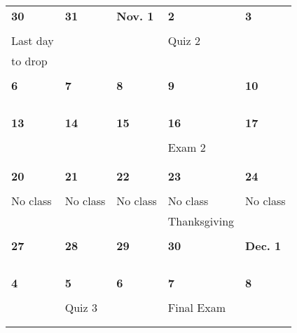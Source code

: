 \documentclass[letter, 12pt]{article}
\begin{document}
\begin{center}
\begin{tabular}{|l|l|l|l|l|}
\textbf{30} & \textbf{31} & \textbf{Nov. 1} & \textbf{2} & \textbf{3} \\
&  &  &  & \\
%
{\small Last day}&  &  &Quiz 2  & \\
%
{\small to drop}&  &  &  & \\
%
&  &  &  & \\
\hline

\textbf{6} & \textbf{7} & \textbf{8} & \textbf{9} & \textbf{10} \\
&  &  &  & \\
%
&  &  &  & \\
%
&  &  &  & \\
%
&  &  &  & \\
\hline

\textbf{13} & \textbf{14} & \textbf{15} & \textbf{16} & \textbf{17} \\
& &  &  & \\
%
&  &  &Exam 2  & \\
%
&  &  &  & \\
%
&  &  &  & \\
\hline

\textbf{20} & \textbf{21} & \textbf{22} & \textbf{23} & \textbf{24} \\
&  &  &  & \\
%
No class& No class  & No class  & No class & No class \\
%
&  &  & Thanksgiving & \\
%
&  &  &  & \\
\hline

\textbf{27} & \textbf{28} & \textbf{29} & \textbf{30} & \textbf{Dec. 1} \\
& &  &  & \\
%
&  &  &  & \\
%
&  &  &  & \\
%
&  &  &  & \\
\hline

\textbf{4} & \textbf{5} & \textbf{6} & \textbf{7} &\textbf{8} \\
&  &  &  & \\
%
&Quiz 3  &  &Final Exam  & \\
%
&  &  &  & \\
%
&  &  &  & \\
\hline
\end{tabular}
\end{center}
\end{document}
